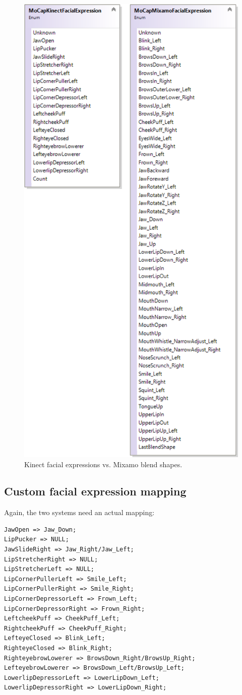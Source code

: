 \documentclass[a4paper, 12pt]{amsart}
\begin{document}
\begin{figure}[htb]
\centering
\includegraphics[width=.6\linewidth]{fig_reflecta_face_enumerations}
\caption{Kinect facial expressions vs. Mixamo blend shapes.}
\label{fig:reflecta_face_enumerations}
\end{figure}

\subsection{Custom facial expression mapping}

Again, the two systems need an actual mapping:

\begin{lstlisting}[basicstyle=\tiny]
JawOpen => Jaw_Down;
LipPucker => NULL;
JawSlideRight => Jaw_Right/Jaw_Left;
LipStretcherRight => NULL;
LipStretcherLeft => NULL;
LipCornerPullerLeft => Smile_Left;
LipCornerPullerRight => Smile_Right;
LipCornerDepressorLeft => Frown_Left;
LipCornerDepressorRight => Frown_Right;
LeftcheekPuff => CheekPuff_Left;
RightcheekPuff => CheekPuff_Right;
LefteyeClosed => Blink_Left;
RighteyeClosed => Blink_Right;
RighteyebrowLowerer => BrowsDown_Right/BrowsUp_Right;
LefteyebrowLowerer => BrowsDown_Left/BrowsUp_Left;
LowerlipDepressorLeft => LowerLipDown_Left;
LowerlipDepressorRight => LowerLipDown_Right;
\end{lstlisting}
\end{document}
